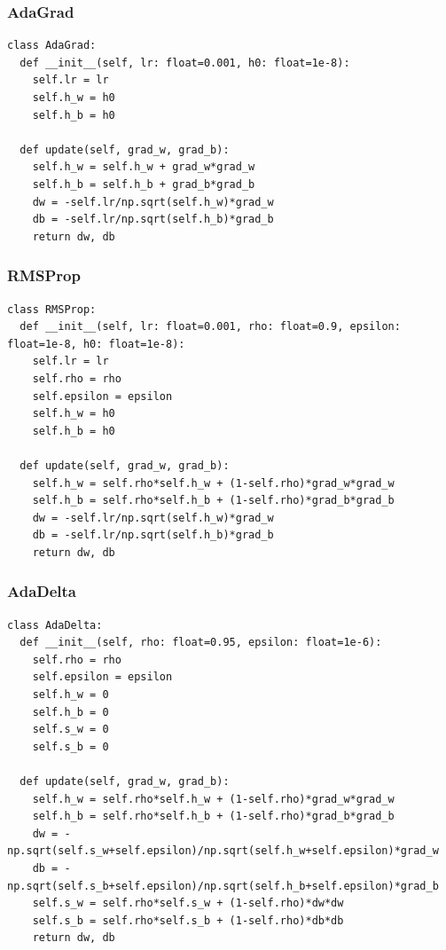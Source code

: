 \documentclass[platex,dvipdfmx]{jsarticle}
\begin{document}
\subsubsection{AdaGrad}

\begin{lstlisting}[caption=ex\_advanced.py, label=AdaGrad]
class AdaGrad:
  def __init__(self, lr: float=0.001, h0: float=1e-8):
    self.lr = lr
    self.h_w = h0
    self.h_b = h0

  def update(self, grad_w, grad_b):
    self.h_w = self.h_w + grad_w*grad_w
    self.h_b = self.h_b + grad_b*grad_b
    dw = -self.lr/np.sqrt(self.h_w)*grad_w
    db = -self.lr/np.sqrt(self.h_b)*grad_b
    return dw, db
\end{lstlisting}

\subsubsection{RMSProp}

\begin{lstlisting}[caption=ex\_advanced.py, label=RMSProp]
class RMSProp:
  def __init__(self, lr: float=0.001, rho: float=0.9, epsilon: float=1e-8, h0: float=1e-8):
    self.lr = lr
    self.rho = rho
    self.epsilon = epsilon
    self.h_w = h0
    self.h_b = h0

  def update(self, grad_w, grad_b):
    self.h_w = self.rho*self.h_w + (1-self.rho)*grad_w*grad_w
    self.h_b = self.rho*self.h_b + (1-self.rho)*grad_b*grad_b
    dw = -self.lr/np.sqrt(self.h_w)*grad_w
    db = -self.lr/np.sqrt(self.h_b)*grad_b
    return dw, db
\end{lstlisting}

\subsubsection{AdaDelta}

\begin{lstlisting}[caption=ex\_advanced.py, label=AdaDelta]
class AdaDelta:
  def __init__(self, rho: float=0.95, epsilon: float=1e-6):
    self.rho = rho
    self.epsilon = epsilon
    self.h_w = 0
    self.h_b = 0
    self.s_w = 0
    self.s_b = 0

  def update(self, grad_w, grad_b):
    self.h_w = self.rho*self.h_w + (1-self.rho)*grad_w*grad_w
    self.h_b = self.rho*self.h_b + (1-self.rho)*grad_b*grad_b
    dw = -np.sqrt(self.s_w+self.epsilon)/np.sqrt(self.h_w+self.epsilon)*grad_w
    db = -np.sqrt(self.s_b+self.epsilon)/np.sqrt(self.h_b+self.epsilon)*grad_b
    self.s_w = self.rho*self.s_w + (1-self.rho)*dw*dw
    self.s_b = self.rho*self.s_b + (1-self.rho)*db*db
    return dw, db
\end{lstlisting}
\end{document}
